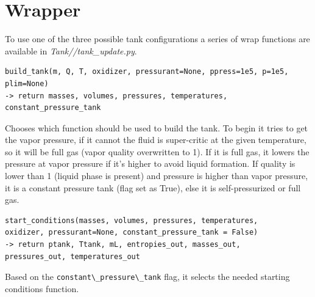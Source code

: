 \section{Wrapper}
To use one of the three possible tank configurations a series of wrap functions are available in \textit{Tank//tank\_update.py}.
\begin{verbatim}
build_tank(m, Q, T, oxidizer, pressurant=None, ppress=1e5, p=1e5, plim=None)
-> return masses, volumes, pressures, temperatures, constant_pressure_tank
\end{verbatim}
\hspace*{2em} Chooses which function should be used to build the tank. To begin it tries to get the vapor pressure, if it cannot the fluid is super-critic at the given temperature, so it will be full gas (vapor quality overwritten to 1).
If it is full gas, it lowers the pressure at vapor pressure if it's higher to avoid liquid formation.
If quality is lower than 1 (liquid phase is present) and pressure is higher than vapor pressure, it is a constant pressure tank (flag set as True), else it is self-pressurized or full gas.

\begin{verbatim}
start_conditions(masses, volumes, pressures, temperatures,
oxidizer, pressurant=None, constant_pressure_tank = False)
-> return ptank, Ttank, mL, entropies_out, masses_out,
pressures_out, temperatures_out
\end{verbatim}
\hspace*{2em} Based on the \verb|constant\_pressure\_tank| flag, it selects the needed starting conditions function.

